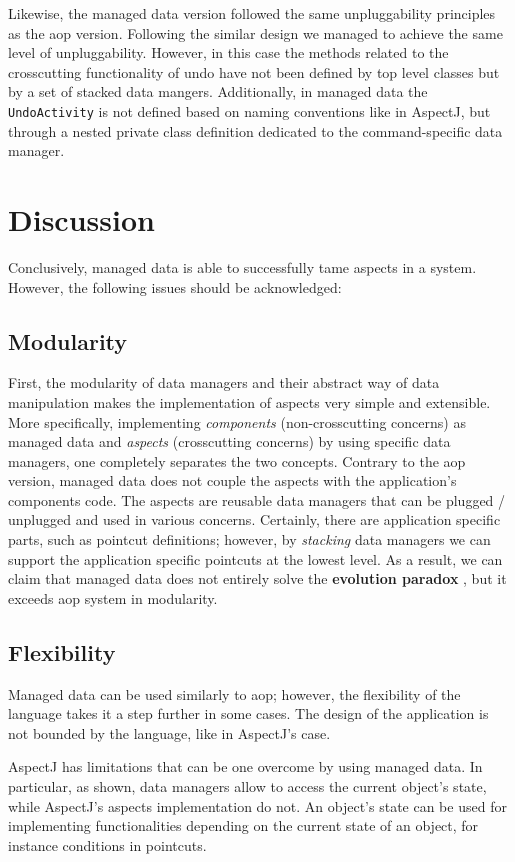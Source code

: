 Likewise, the managed data version followed the same unpluggability principles as the \ac{aop} version.
Following the similar design we managed to achieve the same level of unpluggability.
However, in this case the methods related to the crosscutting functionality of undo have not been defined by top level classes but by a set of stacked data mangers.
Additionally, in managed data the \texttt{UndoActivity} is not defined based on naming conventions like in AspectJ, but through a nested private class definition dedicated to the command-specific data manager.

\section{Discussion}\label{Evaluation Discussion}
Conclusively, managed data is able to successfully tame aspects in a system.
However, the following issues should be acknowledged:

\subsection{Modularity}
First, the modularity of data managers and their abstract way of data manipulation makes the implementation of aspects very simple and extensible.
More specifically, implementing \textit{components} (non-crosscutting concerns) as managed data and \textit{aspects} (crosscutting concerns) by using specific data managers, one completely separates the two concepts.
Contrary to the \ac{aop} version, managed data does not couple the aspects with the application's components code.
The aspects are reusable data managers that can be plugged / unplugged and used in various concerns.
Certainly, there are application specific parts, such as pointcut definitions; however, by \textit{stacking} data managers we can support the application specific pointcuts at the lowest level.
As a result, we can claim that managed data does not entirely solve the \textbf{evolution paradox} \cite{tourwe2003existence}, but it exceeds \ac{aop} system in modularity.

\subsection{Flexibility}
Managed data can be used similarly to \ac{aop}; however, the flexibility of the language takes it a step further in some cases.
The design of the application is not bounded by the language, like in AspectJ's case.

AspectJ has limitations that can be one overcome by using managed data.
In particular, as shown, data managers allow to access the current object's state, while AspectJ's aspects implementation do not.
An object's state can be used for implementing functionalities depending on the current state of an object, for instance conditions in pointcuts.


